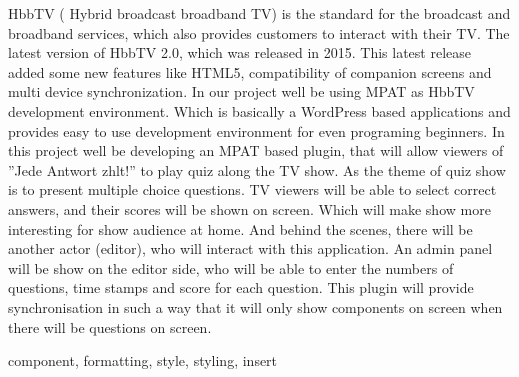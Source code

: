 HbbTV ( Hybrid broadcast broadband TV) is the
standard for the broadcast and broadband services, which also
provides customers to interact with their TV. The latest version of
HbbTV 2.0, which was released in 2015. This latest release added
some new features like HTML5, compatibility of companion
screens and multi device synchronization. In our project well
be using MPAT as HbbTV development environment. Which is
basically a WordPress based applications and provides easy to
use development environment for even programing beginners. In
this project well be developing an MPAT based plugin, that will
allow viewers of ”Jede Antwort zhlt!” to play quiz along the TV
show. As the theme of quiz show is to present multiple choice
questions. TV viewers will be able to select correct answers, and
their scores will be shown on screen. Which will make show more
interesting for show audience at home. And behind the scenes,
there will be another actor (editor), who will interact with this
application. An admin panel will be show on the editor side, who
will be able to enter the numbers of questions, time stamps and
score for each question. This plugin will provide synchronisation
in such a way that it will only show components on screen when
there will be questions on screen.




\begin{IEEEkeywords}
component, formatting, style, styling, insert

\end{IEEEkeywords}